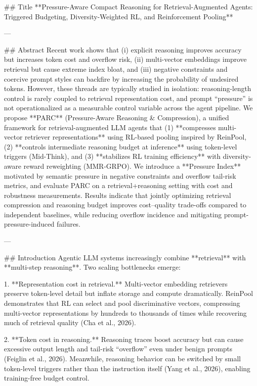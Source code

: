 ## Title  
**Pressure-Aware Compact Reasoning for Retrieval-Augmented Agents: Triggered Budgeting, Diversity-Weighted RL, and Reinforcement Pooling**

---

## Abstract  
Recent work shows that (i) explicit reasoning improves accuracy but increases token cost and overflow risk, (ii) multi-vector embeddings improve retrieval but cause extreme index bloat, and (iii) negative constraints and coercive prompt styles can backfire by increasing the probability of undesired tokens. However, these threads are typically studied in isolation: reasoning-length control is rarely coupled to retrieval representation cost, and prompt “pressure” is not operationalized as a measurable control variable across the agent pipeline. We propose **PARC** (Pressure-Aware Reasoning & Compression), a unified framework for retrieval-augmented LLM agents that (1) **compresses multi-vector retriever representations** using RL-based pooling inspired by ReinPool, (2) **controls intermediate reasoning budget at inference** using token-level triggers (Mid-Think), and (3) **stabilizes RL training efficiency** with diversity-aware reward reweighting (MMR-GRPO). We introduce a **Pressure Index** motivated by semantic pressure in negative constraints and overflow tail-risk metrics, and evaluate PARC on a retrieval+reasoning setting with cost and robustness measurements. Results indicate that jointly optimizing retrieval compression and reasoning budget improves cost–quality trade-offs compared to independent baselines, while reducing overflow incidence and mitigating prompt-pressure-induced failures.

---

## Introduction  
Agentic LLM systems increasingly combine **retrieval** with **multi-step reasoning**. Two scaling bottlenecks emerge:

1. **Representation cost in retrieval.** Multi-vector embedding retrievers preserve token-level detail but inflate storage and compute dramatically. ReinPool demonstrates that RL can select and pool discriminative vectors, compressing multi-vector representations by hundreds to thousands of times while recovering much of retrieval quality (Cha et al., 2026).

2. **Token cost in reasoning.** Reasoning traces boost accuracy but can cause excessive output length and tail-risk “overflow” even under benign prompts (Feiglin et al., 2026). Meanwhile, reasoning behavior can be switched by small token-level triggers rather than the instruction itself (Yang et al., 2026), enabling training-free budget control.

